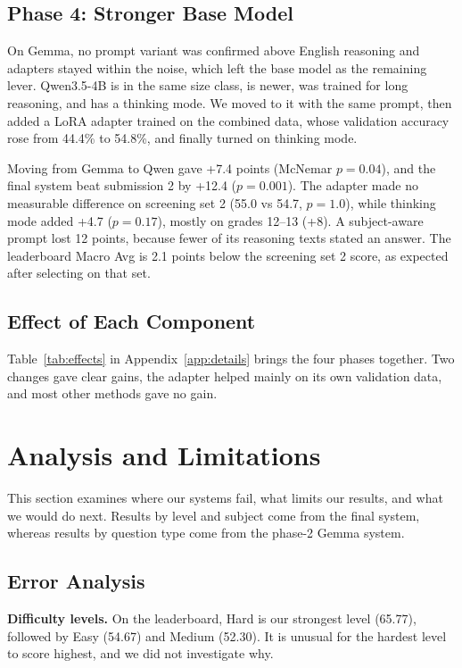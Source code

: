 \documentclass[11pt]{article}
\newcommand{\para}[1]{\smallskip\noindent\textbf{#1}\enspace}
\begin{document}
\subsection{Phase 4: Stronger Base Model}\label{sec:phase4}
On Gemma, no prompt variant was confirmed above English reasoning and adapters stayed within the noise, which left the base model as the remaining lever. Qwen3.5-4B is in the same size class, is newer, was trained for long reasoning, and has a thinking mode. We moved to it with the same prompt, then added a LoRA adapter trained on the combined data, whose validation accuracy rose from 44.4\% to 54.8\%, and finally turned on thinking mode.

Moving from Gemma to Qwen gave +7.4 points (McNemar $p=0.04$), and the final system beat submission 2 by +12.4 ($p=0.001$). The adapter made no measurable difference on screening set 2 (55.0 vs 54.7, $p=1.0$), while thinking mode added +4.7 ($p=0.17$), mostly on grades 12--13 (+8). A subject-aware prompt lost 12 points, because fewer of its reasoning texts stated an answer. The leaderboard Macro Avg is 2.1 points below the screening set 2 score, as expected after selecting on that set.

\subsection{Effect of Each Component}\label{sec:effects}
Table~\ref{tab:effects} in Appendix~\ref{app:details} brings the four phases together. Two changes gave clear gains, the adapter helped mainly on its own validation data, and most other methods gave no gain.

\section{Analysis and Limitations}\label{sec:limits}
This section examines where our systems fail, what limits our results, and what we would do next. Results by level and subject come from the final system, whereas results by question type come from the phase-2 Gemma system.

\subsection{Error Analysis}
\para{Difficulty levels.} On the leaderboard, Hard is our strongest level (65.77), followed by Easy (54.67) and Medium (52.30). It is unusual for the hardest level to score highest, and we did not investigate why.
\end{document}
